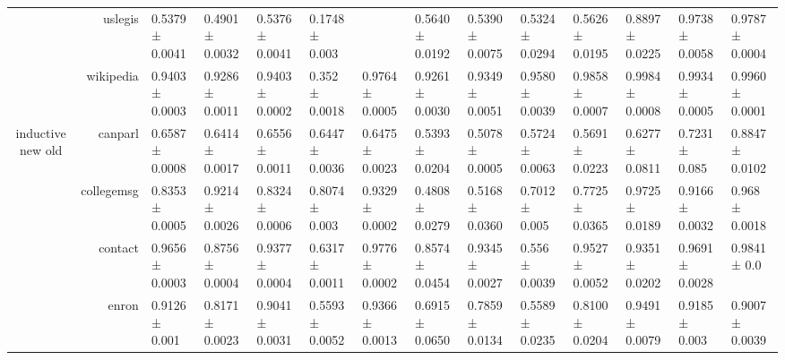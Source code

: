 {\begin{tabular}{@{}crllllllllllll@{}}
                                    & uslegis              & 0.5379 ± 0.0041           & 0.4901 ± 0.0032            & 0.5376 ± 0.0041           & 0.1748 ± 0.003             & \multicolumn{1}{l|}{}                & 0.5640 ± 0.0192           & 0.5390 ± 0.0075           & 0.5324 ± 0.0294          & 0.5626 ± 0.0195         & 0.8897 ± 0.0225         & 0.9738 ± 0.0058          & 0.9787 ± 0.0004            \\
                                    & wikipedia            & 0.9403 ± 0.0003           & 0.9286 ± 0.0011            & 0.9403 ± 0.0002           & 0.352 ± 0.0018             & \multicolumn{1}{l|}{0.9764 ± 0.0005} & 0.9261 ± 0.0030           & 0.9349 ± 0.0051           & 0.9580 ± 0.0039          & 0.9858 ± 0.0007         & 0.9984 ± 0.0008         & 0.9934 ± 0.0005          & 0.9960 ± 0.0001            \\
\multirow{15}{*}{inductive new old} & canparl              & 0.6587 ± 0.0008           & 0.6414 ± 0.0017            & 0.6556 ± 0.0011           & 0.6447 ± 0.0036            & \multicolumn{1}{l|}{0.6475 ± 0.0023} & 0.5393 ± 0.0204           & 0.5078 ± 0.0005           & 0.5724 ± 0.0063          & 0.5691 ± 0.0223         & 0.6277 ± 0.0811         & 0.7231 ± 0.085           & 0.8847 ± 0.0102            \\
                                    & collegemsg           & 0.8353 ± 0.0005           & 0.9214 ± 0.0026            & 0.8324 ± 0.0006           & 0.8074 ± 0.003             & \multicolumn{1}{l|}{0.9329 ± 0.0002} & 0.4808 ± 0.0279           & 0.5168 ± 0.0360           & 0.7012 ± 0.005           & 0.7725 ± 0.0365         & 0.9725 ± 0.0189         & 0.9166 ± 0.0032          & 0.968 ± 0.0018             \\
                                    & contact              & 0.9656 ± 0.0003           & 0.8756 ± 0.0004            & 0.9377 ± 0.0004           & 0.6317 ± 0.0011            & \multicolumn{1}{l|}{0.9776 ± 0.0002} & 0.8574 ± 0.0454           & 0.9345 ± 0.0027           & 0.556 ± 0.0039           & 0.9527 ± 0.0052         & 0.9351 ± 0.0202         & 0.9691 ± 0.0028          & 0.9841 ± 0.0               \\
                                    & enron                & 0.9126 ± 0.001            & 0.8171 ± 0.0023            & 0.9041 ± 0.0031           & 0.5593 ± 0.0052            & \multicolumn{1}{l|}{0.9366 ± 0.0013} & 0.6915 ± 0.0650           & 0.7859 ± 0.0134           & 0.5589 ± 0.0235          & 0.8100 ± 0.0204         & 0.9491 ± 0.0079         & 0.9185 ± 0.003           & 0.9007 ± 0.0039            \\

\end{tabular}}

